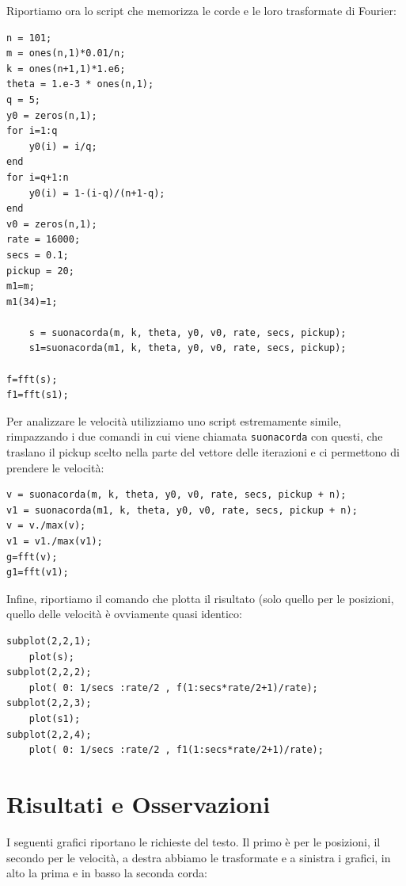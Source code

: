 \documentclass{article}
\begin{document}
\noindent
Riportiamo ora lo script che memorizza le corde e le loro trasformate di Fourier:

\begin{lstlisting}
n = 101;
m = ones(n,1)*0.01/n;
k = ones(n+1,1)*1.e6;
theta = 1.e-3 * ones(n,1);
q = 5;
y0 = zeros(n,1);
for i=1:q
	y0(i) = i/q;
end
for i=q+1:n
	y0(i) = 1-(i-q)/(n+1-q);
end
v0 = zeros(n,1);
rate = 16000;
secs = 0.1;
pickup = 20;
m1=m;
m1(34)=1;	
		
	s = suonacorda(m, k, theta, y0, v0, rate, secs, pickup);
	s1=suonacorda(m1, k, theta, y0, v0, rate, secs, pickup);

f=fft(s);
f1=fft(s1);
\end{lstlisting}

\noindent
Per analizzare le velocità utilizziamo uno script estremamente simile, rimpazzando i due comandi in cui viene chiamata \texttt{suonacorda} con questi, che traslano il pickup scelto nella parte del vettore delle iterazioni e ci permettono di prendere le velocità:

\begin{lstlisting}
v = suonacorda(m, k, theta, y0, v0, rate, secs, pickup + n);
v1 = suonacorda(m1, k, theta, y0, v0, rate, secs, pickup + n);
v = v./max(v);
v1 = v1./max(v1);
g=fft(v);
g1=fft(v1);
\end{lstlisting}

\noindent
Infine, riportiamo il comando che plotta il risultato (solo quello per le posizioni, quello delle velocità è ovviamente quasi identico:

\begin{lstlisting}
subplot(2,2,1);
	plot(s);
subplot(2,2,2);
	plot( 0: 1/secs :rate/2 , f(1:secs*rate/2+1)/rate);
subplot(2,2,3);
	plot(s1);
subplot(2,2,4);
	plot( 0: 1/secs :rate/2 , f1(1:secs*rate/2+1)/rate);
\end{lstlisting}

\section{Risultati e Osservazioni}

I seguenti grafici riportano le richieste del testo. Il primo è per le posizioni, il secondo per le velocità, a destra abbiamo le trasformate e a sinistra i grafici, in alto la prima e in basso la seconda corda:
\end{document}
